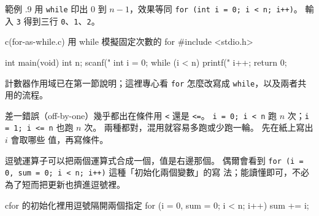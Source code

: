 範例 \thechapter.9 用 \texttt{while} 印出 $0$ 到 $n-1$，效果等同
\texttt{for (int i = 0; i < n; i++)}。 輸入 \texttt{3} 得到三行
\texttt{0}、\texttt{1}、\texttt{2}。

\begin{example}{c}{(for-as-while.c) 用 while 模擬固定次數的 for}
#include <stdio.h>

int main(void) {
    int n;
    scanf("%
    int i = 0;
    while (i < n) {
        printf("%
        i++;
    }
    return 0;
}
\end{example}


\begin{center}
\label{fig:ch05-for-while-flow}
\end{center}

計數器作用域已在第一節說明；這裡專心看 \texttt{for} 怎麼改寫成
\texttt{while}，以及兩者共用的流程。

差一錯誤（off-by-one）幾乎都出在條件用 \texttt{<} 還是 \texttt{<=}。
\texttt{i = 0; i < n} 跑 $n$ 次；\texttt{i = 1; i <= n} 也跑 $n$
次。 兩種都對，混用就容易多跑或少跑一輪。 先在紙上寫出 $i$ 會取哪些
值，再寫條件。

逗號運算子可以把兩個運算式合成一個，值是右邊那個。 偶爾會看到
\texttt{for (i = 0, sum = 0; i < n; i++)} 這種「初始化兩個變數」的寫
法；能讀懂即可，不必為了短而把更新也擠進逗號裡。

\begin{code}{c}{for 的初始化裡用逗號隔開兩個指定}
for (i = 0, sum = 0; i < n; i++) {
    sum += i;
}
\end{code}

